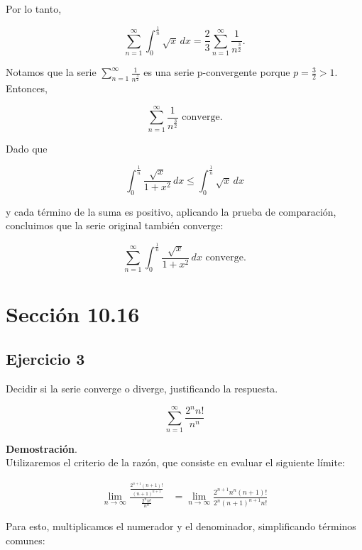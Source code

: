 \documentclass{article}
\begin{document}
    Por lo tanto,

    $$ \sum_{n=1}^{\infty} \int_{0}^{\frac{1}{n}} \sqrt{x} \, dx = \frac{2}{3} \sum_{n=1}^{\infty} \frac{1}{n^{\frac{3}{2}}}. $$

    Notamos que la serie $\sum_{n=1}^{\infty} \frac{1}{n^{\frac{3}{2}}}$ es una serie p-convergente porque $p=\frac{3}{2}>1$. Entonces,

    $$ \sum_{n=1}^{\infty} \frac{1}{n^{\frac{3}{2}}} \text{ converge}. $$

    Dado que

    $$ \int_{0}^{\frac{1}{n}} \frac{\sqrt{x}}{1 + x^2} \, dx \leq \int_{0}^{\frac{1}{n}} \sqrt{x} \, dx $$

    y cada término de la suma es positivo, aplicando la prueba de comparación, concluimos que la serie original también converge:

    $$ \sum_{n=1}^{\infty} \int_{0}^{\frac{1}{n}} \frac{\sqrt{x}}{1 + x^2} \, dx \text{ converge}. $$
    \section*{Sección 10.16}
    \subsection*{Ejercicio 3}

    Decidir si la serie converge o diverge, justificando la respuesta.

    $$
    \sum_{n=1}^{\infty} \frac{2^{n} n!}{n^{n}}
    $$

    \textbf{Demostración}.\\

    Utilizaremos el criterio de la razón, que consiste en evaluar el siguiente límite:

    $$
    \begin{aligned}
    \lim _{n \rightarrow \infty} \frac{\frac{2^{n+1}(n+1)!}{(n+1)^{n+1}}}{\frac{2^{n} n!}{n^{n}}} & =\lim _{n \rightarrow \infty} \frac{2^{n+1} n^{n}(n+1)!}{2^{n}(n+1)^{n+1} n!}
    \end{aligned}
    $$

    Para esto, multiplicamos el numerador y el denominador, simplificando términos comunes:
\end{document}
